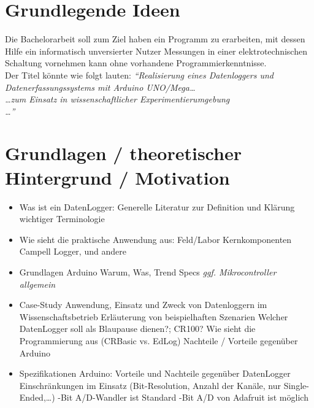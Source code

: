 \section{Grundlegende Ideen}
Die Bachelorarbeit soll zum Ziel haben ein Programm zu erarbeiten, mit dessen
Hilfe ein informatisch unversierter Nutzer Messungen in einer
elektrotechnischen Schaltung vornehmen kann ohne vorhandene
Programmierkenntnisse.\\
Der Titel könnte wie folgt lauten:
\textit{``Realisierung eines Datenloggers und Datenerfassungssystems mit Arduino 
UNO/Mega…\\
…zum Einsatz in wissenschaftlicher Experimentierumgebung\\
…''}

\section{Grundlagen / theoretischer Hintergrund / Motivation}
\begin{itemize}
 \item Was ist ein DatenLogger:
 \subitem Generelle Literatur zur Definition und Klärung wichtiger Terminologie
 \item Wie sieht die praktische Anwendung aus:
 \subitem Feld/Labor
 \subitem Kernkomponenten
 \subitem Campell Logger, und andere
 \item Grundlagen Arduino
 \subitem Warum, Was, Trend
 \subitem Specs
 \subitem \textit{ggf. Mikrocontroller allgemein}
 \item Case-Study
 \subitem Anwendung, Einsatz und Zweck von Datenloggern im Wissenschaftsbetrieb
 \subitem Erläuterung von beispielhaften Szenarien
 \subitem Welcher DatenLogger soll als Blaupause dienen?; CR100?
 \subitem Wie sieht die Programmierung aus (CRBasic vs. EdLog)
 \subitem Nachteile / Vorteile gegenüber Arduino
 \item Spezifikationen Arduino:
 \subitem Vorteile und Nachteile gegenüber DatenLogger
 \subitem Einschränkungen im Einsatz (Bit-Resolution, Anzahl der Kanäle, nur 
Single-Ended,…)
 -Bit A/D-Wandler ist Standard
 -Bit A/D von Adafruit ist möglich 
\end{itemize}


